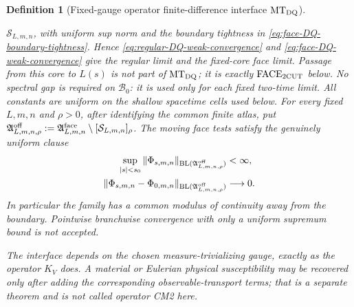 \documentclass[11pt]{article}
\newtheorem{definition}[theorem]{Definition}
\newcommand{\cB}{\mathcal B}
\begin{document}
\begin{definition}[Fixed-gauge operator finite-difference interface
$\mathrm{MT}_{\rm DQ}$]
\begin{enumerate}[label=\textup{(MT\arabic*)}]
      $\mathcal S_{L,m,n}$, with uniform sup norm and the boundary tightness in
      \eqref{eq:face-DQ-boundary-tightness}.  Hence
      \eqref{eq:regular-DQ-weak-convergence} and
      \eqref{eq:face-DQ-weak-convergence} give the regular limit and the
      fixed-core face limit.  Passage from this core to $L(s)$ is not part of
      $\mathrm{MT}_{\rm DQ}$; it is exactly
      $\mathrm{FACE}_{\rm 2CUT}$ below.
      No spectral gap is required on $\cB_0$: it is used only for each fixed
      two-time limit.  All constants are uniform on the shallow spacetime
      cells used below.
      For every fixed $L,m,n$ and $\rho>0$, after identifying the common
      finite atlas, put
      $\mathfrak A_{L,m,n,\rho}^{\rm off}
       :=\mathfrak A_{L,m,n}^{\rm face}
          \setminus[\mathcal S_{L,m,n}]_\rho$.
      The moving face tests satisfy the genuinely uniform clause
      \begin{equation}
      \label{eq:moving-face-test-BL-convergence}
      \begin{aligned}
       \sup_{|s|<s_0}
       \|\Phi_{s,m,n}\|_{{\rm BL}(\mathfrak A_{L,m,n,\rho}^{\rm off})}
       &<\infty,\\
       \|\Phi_{s,m,n}-\Phi_{0,m,n}\|_{{\rm BL}(
          \mathfrak A_{L,m,n,\rho}^{\rm off})}
       &\longrightarrow0.
      \end{aligned}
      \end{equation}
      In particular the family has a common modulus of continuity away from
      the boundary.  Pointwise branchwise convergence with only a uniform
      supremum bound is not accepted.
\end{enumerate}
The interface depends on the chosen measure-trivializing gauge, exactly as
the operator $K_V$ does.  A material or Eulerian physical susceptibility may
be recovered only after adding the corresponding observable-transport terms;
that is a separate theorem and is not called operator CM2 here.
\end{definition}
\end{document}
